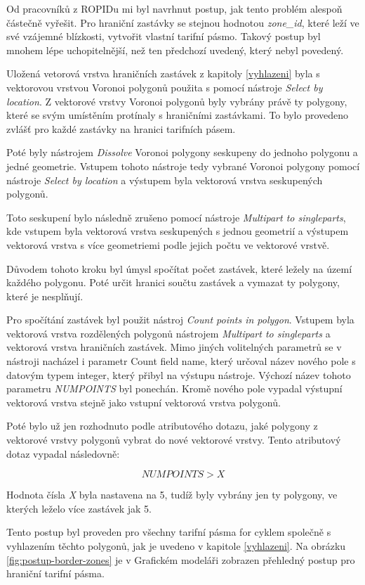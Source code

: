 Od pracovníků z ROPIDu mi byl navrhnut postup, jak tento problém alespoň částečně vyřešit. Pro hraniční zastávky se stejnou hodnotou \textit{zone\_id}, 
které leží ve své vzájemné blízkosti, vytvořit vlastní tarifní pásmo. Takový postup byl mnohem lépe uchopitelnější, než ten předchozí uvedený, který nebyl povedený.

Uložená vetorová vrstva hraničních zastávek z kapitoly \ref{vyhlazeni} byla s vektorovou vrstvou Voronoi polygonů
použita s pomocí nástroje \textit{Select by location}. Z vektorové vrstvy Voronoi polygonů byly vybrány právě ty polygony,
které se svým umístěním protínaly s hraničními zastávkami. To bylo provedeno zvlášť pro každé zastávky na hranici tarifních pásem.

Poté byly nástrojem \textit{Dissolve} Voronoi polygony seskupeny do jednoho polygonu a jedné geometrie. Vstupem tohoto nástroje
tedy vybrané Voronoi polygony pomocí nástroje \textit{Select by location} a výstupem byla vektorová vrstva seskupených polygonů.

Toto seskupení bylo následně zrušeno pomocí nástroje \textit{Multipart to singleparts}, kde vstupem byla vektorová vrstva 
seskupených s jednou geometrií a výstupem vektorová vrstva s více geometriemi podle jejich počtu ve vektorové vrstvě.

Důvodem tohoto kroku byl úmysl spočítat počet zastávek, které ležely na území každého polygonu. Poté určit hranici
součtu zastávek a vymazat ty polygony, které je nesplňují.

Pro spočítání zastávek byl použit nástroj \textit{Count points in polygon}. Vstupem byla vektorová vrstva rozdělených polygonů nástrojem \textit{Multipart to singleparts}
a vektorová vrstva hraničních zastávek. Mimo jiných volitelných parametrů se v nástroji nacházel i parametr Count field name, který určoval název nového pole 
s datovým typem integer,
který přibyl na výstupu nástroje. Výchozí název tohoto parametru \textit{NUMPOINTS} byl ponechán. Kromě nového pole vypadal výstupní vektorová vrstva stejně
jako vstupní vektorová vrstva polygonů.

Poté bylo už jen rozhodnuto podle atributového dotazu, jaké polygony z vektorové vrstvy polygonů vybrat do nové vektorové vrstvy.
Tento atributový dotaz vypadal následovně: 

\[NUMPOINTS > X\]

Hodnota čísla \textit{X} byla nastavena na 5, tudíž byly vybrány jen ty polygony, ve kterých leželo více zastávek jak 5.

Tento postup byl proveden pro všechny tarifní pásma for cyklem společně s vyhlazením těchto polygonů,
jak je uvedeno v kapitole \ref{vyhlazeni}. Na obrázku \ref{fig:postup-border-zones} je v Grafickém modeláři zobrazen
přehledný postup pro hraniční tarifní pásma. 

